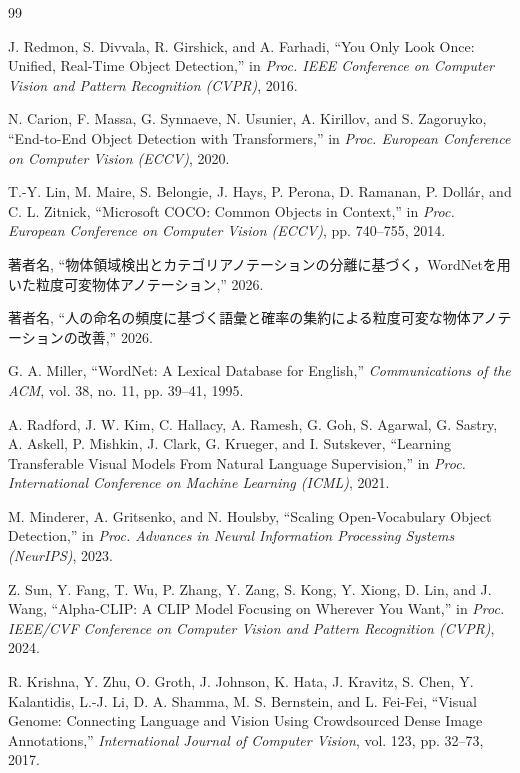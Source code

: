 \vspace{-1mm}
\begin{thebibliography}{99}
\small

    J. Redmon, S. Divvala, R. Girshick, and A. Farhadi,
    ``You Only Look Once: Unified, Real-Time Object Detection,''
    in {\it Proc. IEEE Conference on Computer Vision and Pattern Recognition (CVPR)}, 2016.

    N. Carion, F. Massa, G. Synnaeve, N. Usunier, A. Kirillov, and S. Zagoruyko,
    ``End-to-End Object Detection with Transformers,''
    in {\it Proc. European Conference on Computer Vision (ECCV)}, 2020.

    T.-Y. Lin, M. Maire, S. Belongie, J. Hays, P. Perona, D. Ramanan, P. Doll\'{a}r, and C. L. Zitnick,
    ``Microsoft COCO: Common Objects in Context,''
    in {\it Proc. European Conference on Computer Vision (ECCV)}, pp. 740--755, 2014.

    著者名,
    ``物体領域検出とカテゴリアノテーションの分離に基づく，WordNetを用いた粒度可変物体アノテーション,''
    2026.

    著者名,
    ``人の命名の頻度に基づく語彙と確率の集約による粒度可変な物体アノテーションの改善,''
    2026.

    G. A. Miller,
    ``WordNet: A Lexical Database for English,''
    {\it Communications of the ACM}, vol. 38, no. 11, pp. 39--41, 1995.

    A. Radford, J. W. Kim, C. Hallacy, A. Ramesh, G. Goh, S. Agarwal, G. Sastry, A. Askell, P. Mishkin, J. Clark, G. Krueger, and I. Sutskever,
    ``Learning Transferable Visual Models From Natural Language Supervision,''
    in {\it Proc. International Conference on Machine Learning (ICML)}, 2021.

    M. Minderer, A. Gritsenko, and N. Houlsby,
    ``Scaling Open-Vocabulary Object Detection,''
    in {\it Proc. Advances in Neural Information Processing Systems (NeurIPS)}, 2023.

    Z. Sun, Y. Fang, T. Wu, P. Zhang, Y. Zang, S. Kong, Y. Xiong, D. Lin, and J. Wang,
    ``Alpha-CLIP: A CLIP Model Focusing on Wherever You Want,''
    in {\it Proc. IEEE/CVF Conference on Computer Vision and Pattern Recognition (CVPR)}, 2024.

    R. Krishna, Y. Zhu, O. Groth, J. Johnson, K. Hata, J. Kravitz, S. Chen, Y. Kalantidis, L.-J. Li, D. A. Shamma, M. S. Bernstein, and L. Fei-Fei,
    ``Visual Genome: Connecting Language and Vision Using Crowdsourced Dense Image Annotations,''
    {\it International Journal of Computer Vision}, vol. 123, pp. 32--73, 2017.


\end{thebibliography}
